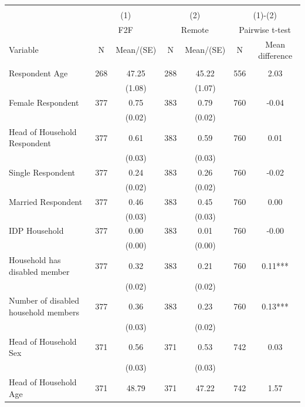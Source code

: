 \begin{tabular}{@{\extracolsep{5pt}}lcccccc}
\\[-1.8ex]\hline \hline \\[-1.8ex]
 & \multicolumn{2}{c}{(1)}  & \multicolumn{2}{c}{(2)}  & \multicolumn{2}{c}{(1)-(2)} \\
 & \multicolumn{2}{c}{F2F}  & \multicolumn{2}{c}{Remote}  & \multicolumn{2}{c}{Pairwise t-test}  \\
Variable & N & Mean/(SE) & N & Mean/(SE) & N & Mean difference \\ \hline \\[-1.8ex] 
Respondent Age   & 268    & 47.25    & 288    & 45.22    & 556    & 2.03   \\
 &   & (1.08)  &   & (1.07)  &   &  \\ [1ex]
Female Respondent   & 377    & 0.75    & 383    & 0.79    & 760    & -0.04   \\
 &   & (0.02)  &   & (0.02)  &   &  \\ [1ex]
Head of Household Respondent   & 377    & 0.61    & 383    & 0.59    & 760    & 0.01   \\
 &   & (0.03)  &   & (0.03)  &   &  \\ [1ex]
Single Respondent   & 377    & 0.24    & 383    & 0.26    & 760    & -0.02   \\
 &   & (0.02)  &   & (0.02)  &   &  \\ [1ex]
Married Respondent   & 377    & 0.46    & 383    & 0.45    & 760    & 0.00   \\
 &   & (0.03)  &   & (0.03)  &   &  \\ [1ex]
IDP Household   & 377    & 0.00    & 383    & 0.01    & 760    & -0.00   \\
 &   & (0.00)  &   & (0.00)  &   &  \\ [1ex]
Household has disabled member   & 377    & 0.32    & 383    & 0.21    & 760    & 0.11***   \\
 &   & (0.02)  &   & (0.02)  &   &  \\ [1ex]
Number of disabled household members   & 377    & 0.36    & 383    & 0.23    & 760    & 0.13***   \\
 &   & (0.03)  &   & (0.02)  &   &  \\ [1ex]
Head of Household Sex   & 371    & 0.56    & 371    & 0.53    & 742    & 0.03   \\
 &   & (0.03)  &   & (0.03)  &   &  \\ [1ex]
Head of Household Age   & 371    & 48.79    & 371    & 47.22    & 742    & 1.57   \\

\end{tabular}
